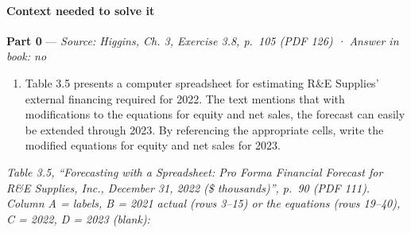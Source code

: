 \documentclass[11pt,a4paper]{article}
\providecommand{\tightlist}{\setlength{\itemsep}{0pt}\setlength{\parskip}{0pt}}
\begin{document}
\paragraph{Context needed to solve it}

\textbf{Part 0} --- \emph{Source: Higgins, Ch. 3, Exercise 3.8, p.~105 (PDF 126) · Answer in book:
no}

\begin{enumerate}
\def\labelenumi{\arabic{enumi}.}
\setcounter{enumi}{7}
\tightlist
\item
  Table 3.5 presents a computer spreadsheet for estimating R\&E Supplies' external financing
  required for 2022. The text mentions that with modifications to the equations for equity and net
  sales, the forecast can easily be extended through 2023. By referencing the appropriate cells,
  write the modified equations for equity and net sales for 2023.
\end{enumerate}

\emph{Table 3.5, ``Forecasting with a Spreadsheet: Pro Forma Financial Forecast for R\&E Supplies,
Inc., December 31, 2022 (\$ thousands)'', p.~90 (PDF 111). Column A = labels, B = 2021 actual (rows
3--15) or the equations (rows 19--40), C = 2022, D = 2023 (blank):}
\end{document}
